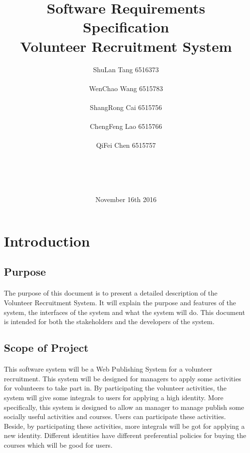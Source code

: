 \documentclass[12pt]{report}
\begin{document}
  
\title{\textbf{\LARGE Software Requirements Specification } \\ Volunteer Recruitment System \\ }

\author{ShuLan Tang 6516373\\\\WenChao Wang 6515783\\\\ ShangRong Cai 6515756\\\\ChengFeng Lao 6515766\\\\QiFei Chen 6515757 \\\\\\\\\\}    
\date{ November 16th 2016} 

 
\maketitle
  \newpage

\tableofcontents
\newpage
\renewcommand\thesection{\arabic {section}}
\section{Introduction}

\subsection{Purpose}
\paragraph{}
The purpose of this document is to present a detailed description of the Volunteer Recruitment System. It will explain the purpose and features of the system, the interfaces of the system and what the system will do. This document is intended for both the stakeholders and the developers of the system.

\subsection{Scope of Project}
\paragraph{}
This software system will be a Web Publishing System for a volunteer recruitment. This system will be designed for managers to apply some activities for volunteers to take part in. By participating the volunteer activities, the system will give some integrals to users for applying a high identity.
More specifically, this system is designed to allow an manager to manage publish some socially useful activities and courses. Users can participate these activities. Beside, by participating these activities, more integrals will be got for applying a new identity. Different identities have different preferential policies for buying the courses which will be good for users.
\end{document}
